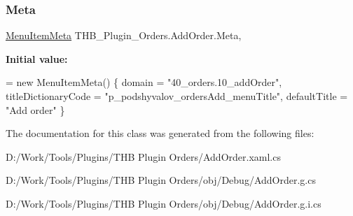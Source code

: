 \subsubsection{\texorpdfstring{Meta}{Meta}}
{\footnotesize\ttfamily \mbox{\hyperlink{class_uniform_client_1_1_plugins_1_1_menu_item_meta}{Menu\+Item\+Meta}} T\+H\+B\+\_\+\+Plugin\+\_\+\+Orders.\+Add\+Order.\+Meta\hspace{0.3cm}{\ttfamily [get]}, {\ttfamily [set]}}

{\bfseries Initial value\+:}
\begin{DoxyCode}
= \textcolor{keyword}{new} MenuItemMeta()
        \{
            domain = \textcolor{stringliteral}{"40\_orders.10\_addOrder"},
            titleDictionaryCode = \textcolor{stringliteral}{"p\_podshyvalov\_ordersAdd\_menuTitle"},
            defaultTitle = \textcolor{stringliteral}{"Add order"}
        \}
\end{DoxyCode}


The documentation for this class was generated from the following files\+:\begin{DoxyCompactItemize}
\item 
D\+:/\+Work/\+Tools/\+Plugins/\+T\+H\+B Plugin Orders/Add\+Order.\+xaml.\+cs\item 
D\+:/\+Work/\+Tools/\+Plugins/\+T\+H\+B Plugin Orders/obj/\+Debug/Add\+Order.\+g.\+cs\item 
D\+:/\+Work/\+Tools/\+Plugins/\+T\+H\+B Plugin Orders/obj/\+Debug/Add\+Order.\+g.\+i.\+cs\end{DoxyCompactItemize}
